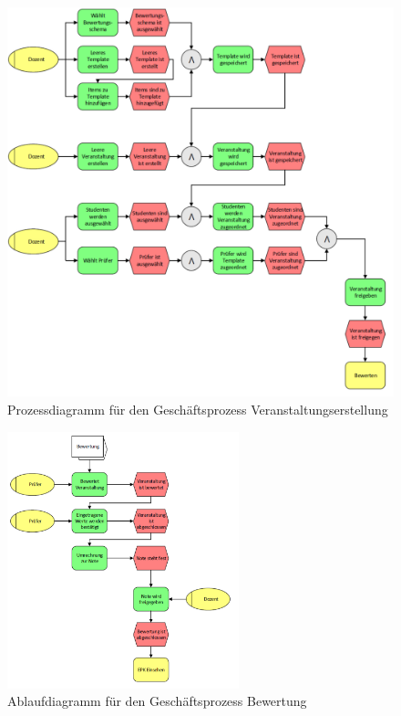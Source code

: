 \begin{appendix}
  	\begin{figure}[th!]
  	\centering
  	\includegraphics[width=\textwidth]{./img/EPK_Veranstaltung}
  	\caption{Prozessdiagramm für den Geschäftsprozess Veranstaltungserstellung}
  	\label{fig:process1}
  	\end{figure}
  		
  	\begin{figure}[th!]
  	\centering
  	\includegraphics[width=0.6\textwidth]{./img/EPK_Bewertung}
  	\caption{Ablaufdiagramm für den Geschäftsprozess Bewertung}
  	\label{fig:process2}
  	\end{figure}
  	

\end{appendix}
